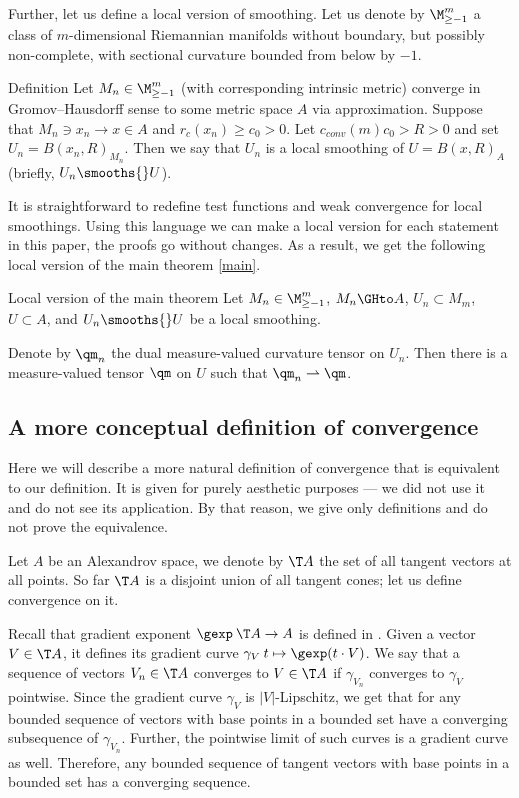 Further, let us define a local version of smoothing.
Let us denote by
$\M_{\ge -1}^m$ a class of $m$-dimensional Riemannian 
manifolds without boundary, but possibly non-complete, with sectional curvature bounded
from below by $-1$.

\begin{thm}{Definition}
Let 
$M_n\in\M_{\ge -1}^m$ (with corresponding intrinsic metric)
converge in Gromov--Hausdorff sense to some metric space $A$ via
approximation.
Suppose that $M_n\ni x_n\to x\in A$
and $r_c(x_n)\ge c_0>0$. Let $c_{conv}(m)c_0 > R>0$ and set
$U_n=B(x_n,R)_{M_n}$.
Then we say that $U_n$ is a local smoothing of $U=B(x,R)_A$ (briefly, $U_n\smooths{} U$).
\end{thm}

It is straightforward to redefine test functions and weak convergence for local smoothings.
Using this language we can make a local version for each statement in this paper, the proofs go without changes.
As a result, we get the following local version of the main theorem \ref{main}.
 
\begin{thm}{Local version of the main theorem}\label{mainloc}
Let   
$M_n\in\M_{\ge -1}^m$,
$M_n\GHto A$, $U_n\subset M_m$,
  $U\subset A$, and $U_n\smooths{} U$ be a local smoothing.
  
Denote by $\qm_n$ the dual measure-valued curvature tensor on $U_n$.
Then there is a measure-valued tensor $\qm$ on $U$ such that $\qm_n\rightharpoonup \qm$.
\end{thm}


\subsection{A more conceptual definition of convergence}\label{sec:concept}

Here we will describe a more natural definition of convergence that is equivalent to our definition.
It is given for purely aesthetic purposes --- we did not use it and do not see its application.
By that reason, we give only definitions and do not prove the equivalence.

Let $A$ be an Alexandrov space, we denote by $\T A$ the set of all tangent vectors at all points.
So far $\T A$ is a disjoint union of all tangent cones;
let us define convergence on it.

Recall that gradient exponent $\gexp\: \T A\to A$ is defined in \cite{AKP}.
Given a vector $V\in \T A$, it defines its gradient curve $\gamma_{V}\:t\mapsto \gexp (t\cdot V)$.
We say that a sequence of vectors $V_n\in \T A$ converges to $V\in \T A$ if $\gamma_{V_n}$ converges to $\gamma_V$ pointwise.
Since the gradient curve $\gamma_V$ is $|V|$-Lipschitz, we get that for any bounded sequence of vectors with base points in a bounded set have a converging subsequence of $\gamma_{V_n}$.
Further, the pointwise limit of such curves is a gradient curve as well.
Therefore, any bounded sequence of tangent vectors with base points in a bounded set has a converging sequence.

